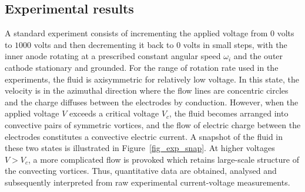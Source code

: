 \subsection{Experimental results}
A standard experiment consists of incrementing the applied voltage from $0$ volts to $1000$ volts and then decrementing it back to $0$ volts in small steps, with the inner anode rotating at a prescribed constant angular speed $\omega_i$ and the outer cathode stationary and grounded. For the range of rotation rate used in the experiments, the fluid is axisymmetric for relatively low voltage. In this state, the velocity is in the azimuthal direction where the flow lines are concentric circles and the charge diffuses between the electrodes by conduction. However, when the applied voltage $V$ exceeds a critical voltage $V_c$, the fluid becomes arranged into convective pairs of symmetric vortices, and the flow of electric charge between the electrodes constitutes a convective electric current. A snapshot of the fluid in these two states is illustrated in Figure~\ref{fig_exp_snap}.
At higher voltages $V > V_c$, a more complicated flow is provoked which retains large-scale structure of the convecting vortices. Thus, quantitative data are obtained, analysed and subsequently interpreted from raw experimental current-voltage measurements.
